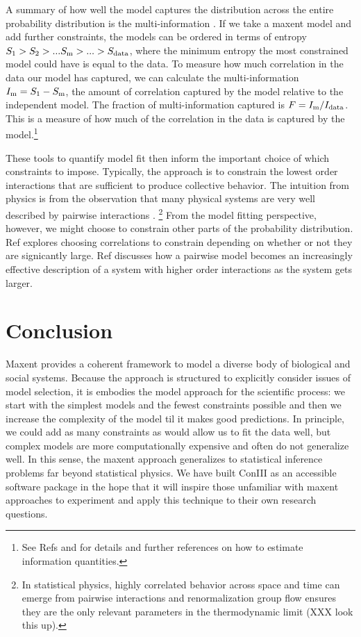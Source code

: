 \documentclass[aps,prl,twocolumn,nofootinbib]{revtex4-1}
\begin{document}
A summary of how well the model captures the distribution across the entire probability distribution is the multi-information \cite{Nemenman:2004wz,Schneidman:2006he}. If we take a maxent model and add further constraints, the models can be ordered in terms of entropy $S_{\rm 1}>S_{2}>...S_{\rm m}>...>S_{\rm data}$, where the minimum entropy the most constrained model could have is equal to the data. To measure how much correlation in the data our model has captured, we can calculate the multi-information $I_{\rm m} = S_{\rm 1}-S_{\rm m}$, the amount of correlation captured by the model relative to the independent model. The fraction of multi-information captured is $F=I_{\rm m}/I_{\rm data}$. This is a measure of how much of the correlation in the data is captured by the model.\footnote{See Refs \cite{Bialek:2012ueb} and \cite{Lee:2015ev} for details and further references on how to estimate information quantities.}

These tools to quantify model fit then inform the important choice of which constraints to impose. Typically, the approach is to constrain the lowest order interactions that are sufficient to produce collective behavior. The intuition from physics is from the observation that many physical systems are very well described by pairwise interactions \cite{Ranganathan:2007wz}.
\footnote{In statistical physics, highly correlated behavior across space and time can emerge from pairwise interactions and renormalization group flow ensures they are the only relevant parameters in the thermodynamic limit \cite{} (XXX look this up).}
From the model fitting perspective, however, we might choose to constrain other parts of the probability distribution. Ref \cite{Ganmor:2011ct} explores choosing correlations to constrain depending on whether or not they are signicantly large. Ref \cite{Nemenman:2016kl} discusses how a pairwise model becomes an increasingly effective description of a system with higher order interactions as the system gets larger.



\section{Conclusion}
Maxent provides a coherent framework to model a diverse body of biological and social systems.  Because the approach is structured to explicitly consider issues of model selection, it is embodies the model approach for the scientific process: we start with the simplest models and the fewest constraints possible and then we increase the complexity of the model til it makes good predictions. In principle, we could add as many constraints as would allow us to fit the data well, but complex models are more computationally expensive and often do not generalize well.
In this sense, the maxent approach generalizes to statistical inference problems far beyond statistical physics.  We have built ConIII as an accessible software package in the hope that it will inspire those unfamiliar with maxent approaches to experiment and apply this technique to their own research questions.
\end{document}
